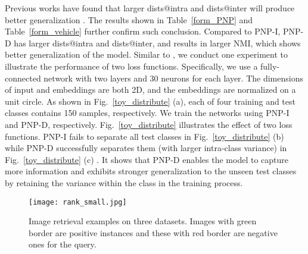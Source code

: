 Previous works have found that larger dists@intra and dists@inter will produce better generalization \cite{roth2020revisiting}.  The results shown in Table~\ref{form_PNP} and Table~\ref{form_vehicle} further confirm such conclusion. Compared to PNP-I, PNP-D has larger dists@intra and dists@inter, and results in larger NMI, which shows better generalization of the model. Similar to \cite{roth2020revisiting}, we conduct one experiment to illustrate the performance of two loss functions.  Specifically, we use a fully-connected network with two layers and 30 neurons for each layer. The dimensions of input and embeddings are both 2D, and the embeddings are normalized on a unit circle. As shown in  Fig.~\ref{toy_distribute} (a), each of four training and test classes contains 150 samples, respectively. We train the networks using PNP-I and PNP-D, respectively. Fig.~\ref{toy_distribute} illustrates the effect of two loss functions. PNP-I fails to separate all test classes in Fig.~\ref{toy_distribute} (b) while PNP-D successfully separates them (with larger intra-class variance) in Fig.~\ref{toy_distribute} (c) . It shows that PNP-D enables the model to capture more information and exhibits stronger generalization to the unseen test classes by retaining the variance within the class in the training process.

\begin{figure}[t]

\centering

\texttt{[image: rank\_small.jpg]}

\caption{Image retrieval examples on three datasets. Images with green border are positive instances and these with red border are negative ones for the query.}
\label{rank_example}

\end{figure}






